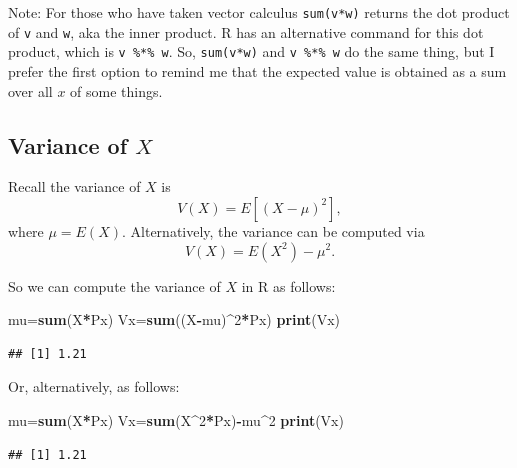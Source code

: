 \documentclass[
]{book}
\newenvironment{Shaded}{\begin{snugshade}}{\end{snugshade}}
\newcommand{\DecValTok}[1]{\textcolor[rgb]{0.00,0.00,0.81}{#1}}
\newcommand{\FunctionTok}[1]{\textcolor[rgb]{0.13,0.29,0.53}{\textbf{#1}}}
\newcommand{\NormalTok}[1]{#1}
\newcommand{\OtherTok}[1]{\textcolor[rgb]{0.56,0.35,0.01}{#1}}
\newcommand{\SpecialCharTok}[1]{\textcolor[rgb]{0.81,0.36,0.00}{\textbf{#1}}}
\theoremstyle{definition}
\theoremstyle{definition}
\theoremstyle{definition}
\theoremstyle{definition}
\theoremstyle{remark}
\begin{document}
Note: For those who have taken vector calculus \texttt{sum(v*w)} returns the dot product of \texttt{v} and \texttt{w}, aka the inner product. R has an alternative command for this dot product, which is \texttt{v\ \%*\%\ w}. So, \texttt{sum(v*w)} and \texttt{v\ \%*\%\ w} do the same thing, but I prefer the first option to remind me that the expected value is obtained as a sum over all \(x\) of some things.

\subsection*{\texorpdfstring{Variance of \(X\)}{Variance of X}}\label{variance-of-x}

Recall the variance of \(X\) is \[V(X) = E[(X-\mu)^2],\] where \(\mu = E(X)\).
Alternatively, the variance can be computed via
\[V(X) = E(X^2)-\mu^2.\]

So we can compute the variance of \(X\) in R as follows:

\begin{Shaded}
\begin{Highlighting}[]
\NormalTok{mu}\OtherTok{=}\FunctionTok{sum}\NormalTok{(X}\SpecialCharTok{*}\NormalTok{Px) }
\NormalTok{Vx}\OtherTok{=}\FunctionTok{sum}\NormalTok{((X}\SpecialCharTok{{-}}\NormalTok{mu)}\SpecialCharTok{\^{}}\DecValTok{2}\SpecialCharTok{*}\NormalTok{Px)}
\FunctionTok{print}\NormalTok{(Vx)}
\end{Highlighting}
\end{Shaded}

\begin{verbatim}
## [1] 1.21
\end{verbatim}

Or, alternatively, as follows:

\begin{Shaded}
\begin{Highlighting}[]
\NormalTok{mu}\OtherTok{=}\FunctionTok{sum}\NormalTok{(X}\SpecialCharTok{*}\NormalTok{Px)}
\NormalTok{Vx}\OtherTok{=}\FunctionTok{sum}\NormalTok{(X}\SpecialCharTok{\^{}}\DecValTok{2}\SpecialCharTok{*}\NormalTok{Px)}\SpecialCharTok{{-}}\NormalTok{mu}\SpecialCharTok{\^{}}\DecValTok{2}
\FunctionTok{print}\NormalTok{(Vx)}
\end{Highlighting}
\end{Shaded}

\begin{verbatim}
## [1] 1.21
\end{verbatim}
\end{document}

